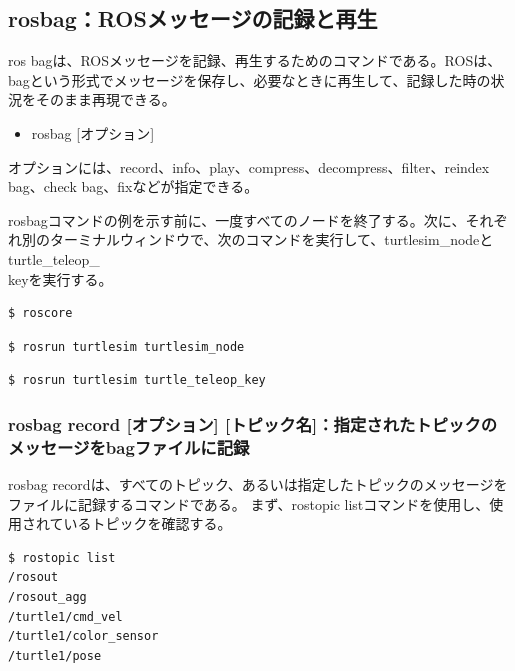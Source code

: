 \subsection{rosbag：ROSメッセージの記録と再生}

ros bagは、ROSメッセージを記録、再生するためのコマンドである。ROSは、bagという形式でメッセージを保存し、必要なときに再生して、記録した時の状況をそのまま再現できる。

\begin{itemize}
\item rosbag [オプション]
\end{itemize}

オプションには、record、info、play、compress、decompress、filter、reindex bag、check bag、fixなどが指定できる。

rosbagコマンドの例を示す前に、一度すべてのノードを終了する。次に、それぞれ別のターミナルウィンドウで、次のコマンドを実行して、turtlesim\_nodeとturtle\_teleop\_\\keyを実行する。

\begin{lstlisting}[language=ROS]
$ roscore
\end{lstlisting}

\begin{lstlisting}[language=ROS]
$ rosrun turtlesim turtlesim_node
\end{lstlisting}

\begin{lstlisting}[language=ROS]
$ rosrun turtlesim turtle_teleop_key
\end{lstlisting}


\subsubsection{rosbag record [オプション] [トピック名]：指定されたトピックのメッセージをbagファイルに記録}

rosbag recordは、すべてのトピック、あるいは指定したトピックのメッセージをファイルに記録するコマンドである。
まず、rostopic listコマンドを使用し、使用されているトピックを確認する。

\begin{lstlisting}[language=ROS]
$ rostopic list
/rosout
/rosout_agg
/turtle1/cmd_vel
/turtle1/color_sensor
/turtle1/pose
\end{lstlisting}

